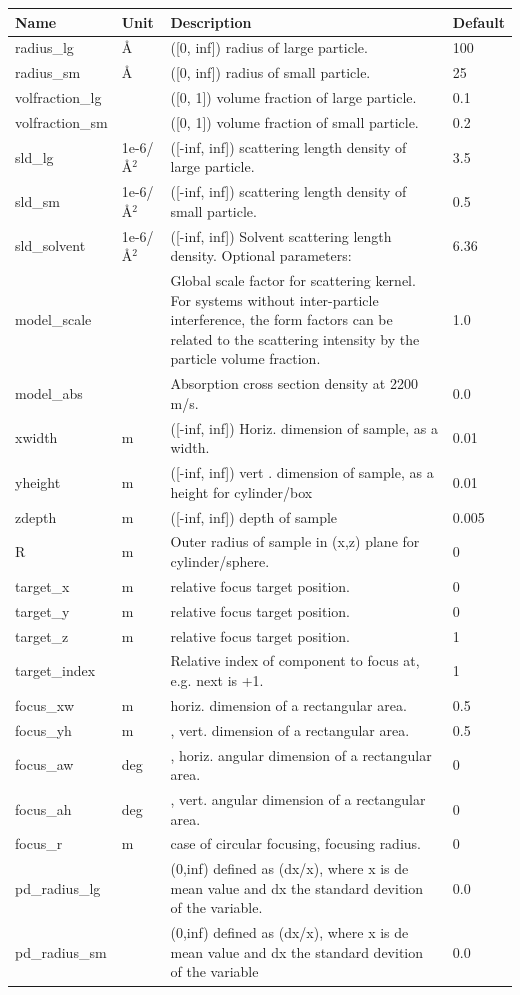 \begin{longtable}{p{}p{}p{}p{}}
\toprule
\textbf{Name} & \textbf{Unit} & \textbf{Description} & \textbf{Default} \\
\midrule
\endhead
radius\_lg & \AA{} & ([0, inf]) radius of large particle. & 100 \\
radius\_sm & \AA{} & ([0, inf]) radius of small particle. & 25 \\
volfraction\_lg &  & ([0, 1]) volume fraction of large particle. & 0.1 \\
volfraction\_sm &  & ([0, 1]) volume fraction of small particle. & 0.2 \\
sld\_lg & 1e-6/\AA{}$^{2}$ & ([-inf, inf]) scattering length density of large particle. & 3.5 \\
sld\_sm & 1e-6/\AA{}$^{2}$ & ([-inf, inf]) scattering length density of small particle. & 0.5 \\
sld\_solvent & 1e-6/\AA{}$^{2}$ & ([-inf, inf]) Solvent scattering length density. Optional parameters: & 6.36 \\
model\_scale &   & Global scale factor for scattering kernel. For systems without inter-particle interference, the form factors can be related to the scattering intensity by the particle volume fraction. & 1.0 \\
model\_abs &   & Absorption cross section density at 2200 m/s. & 0.0 \\
xwidth & m & ([-inf, inf]) Horiz. dimension of sample, as a width. & 0.01 \\
yheight & m & ([-inf, inf]) vert . dimension of sample, as a height for cylinder/box & 0.01 \\
zdepth & m & ([-inf, inf]) depth of sample & 0.005 \\
R & m & Outer radius of sample in (x,z) plane for cylinder/sphere. & 0 \\
target\_x & m & relative focus target position. & 0 \\
target\_y & m & relative focus target position. & 0 \\
target\_z & m & relative focus target position. & 1 \\
target\_index &   & Relative index of component to focus at, e.g. next is +1. & 1 \\
focus\_xw & m & horiz. dimension of a rectangular area. & 0.5 \\
focus\_yh & m & , vert. dimension of a rectangular area. & 0.5 \\
focus\_aw & deg & , horiz. angular dimension of a rectangular area. & 0 \\
focus\_ah & deg & , vert. angular dimension of a rectangular area. & 0 \\
focus\_r & m & case of circular focusing, focusing radius. & 0 \\
pd\_radius\_lg &  & (0,inf) defined as (dx/x), where x is de mean value and dx the standard devition of the variable. & 0.0 \\
pd\_radius\_sm &  & (0,inf) defined as (dx/x), where x is de mean value and dx the standard devition of the variable & 0.0 \\
\bottomrule
\end{longtable}

